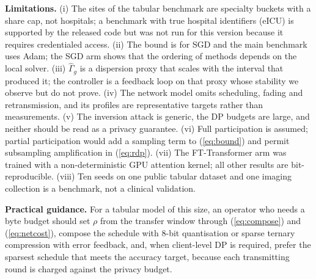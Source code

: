 \textbf{Limitations.}
(i) The sites of the tabular benchmark are specialty buckets with a share cap, not hospitals; a benchmark with true hospital identifiers (eICU) is supported by the released code but was not run for this version because it requires credentialed access.
(ii) The bound is for SGD and the main benchmark uses Adam; the SGD arm shows that the ordering of methods depends on the local solver.
(iii) $\hat\Gamma_g$ is a dispersion proxy that scales with the interval that produced it; the controller is a feedback loop on that proxy whose stability we observe but do not prove.
(iv) The network model omits scheduling, fading and retransmission, and its profiles are representative targets rather than measurements.
(v) The inversion attack is generic, the DP budgets are large, and neither should be read as a privacy guarantee.
(vi) Full participation is assumed; partial participation would add a sampling term to (\ref{eq:bound}) and permit subsampling amplification in (\ref{eq:rdp}).
(vii) The FT-Transformer arm was trained with a non-deterministic GPU attention kernel; all other results are bit-reproducible.
(viii) Ten seeds on one public tabular dataset and one imaging collection is a benchmark, not a clinical validation.

\textbf{Practical guidance.} For a tabular model of this size, an operator who needs a byte budget should set $\rho$ from the transfer window through (\ref{eq:compose}) and (\ref{eq:netcost}), compose the schedule with 8-bit quantisation or sparse ternary compression with error feedback, and, when client-level DP is required, prefer the sparsest schedule that meets the accuracy target, because each transmitting round is charged against the privacy budget.
